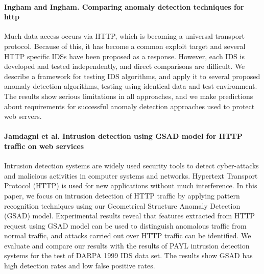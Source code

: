 \paragraph*{Ingham and Ingham. Comparing anomaly detection techniques for http}
\cite{ingham2007comparing}
Much data access occurs via HTTP, which is becoming a universal transport protocol. Because of this, it has become a common exploit target and several HTTP specific IDSs have been proposed as a response. However, each IDS is developed and tested independently, and direct comparisons are difficult. We describe a framework for testing IDS algorithms, and apply it to several proposed anomaly detection algorithms, testing using identical data and test environment. The results show serious limitations in all approaches, and we make predictions about requirements for successful anomaly detection approaches used to protect web servers.

\paragraph*{Jamdagni et al. Intrusion detection using GSAD model for HTTP traffic on web services}
\cite{jamdagni2010intrusion}
Intrusion detection systems are widely used security tools to detect cyber-attacks and malicious activities in computer systems and networks. Hypertext Transport Protocol (HTTP) is used for new applications without much interference. In this paper, we focus on intrusion detection of HTTP traffic by applying pattern recognition techniques using our Geometrical Structure Anomaly Detection (GSAD) model. Experimental results reveal that features extracted from HTTP request using GSAD model can be used to distinguish anomalous traffic from normal traffic, and attacks carried out over HTTP traffic can be identified. We evaluate and compare our results with the results of PAYL intrusion detection systems for the test of DARPA 1999 IDS data set. The results show GSAD has high detection rates and low false positive rates.


